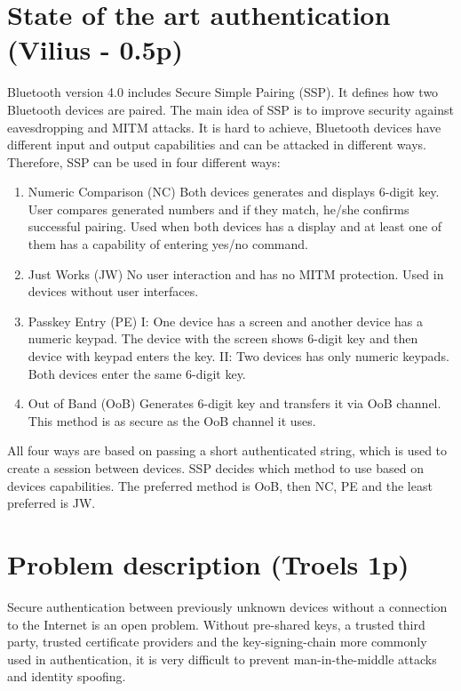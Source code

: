 \documentclass[12pt]{article}
\begin{document}
\section{State of the art authentication (Vilius - 0.5p)}
\label{sec:State of the art authentication}

Bluetooth version 4.0 includes Secure Simple Pairing (SSP). It defines how two Bluetooth devices are paired. The main idea of SSP is to improve security against eavesdropping and MITM attacks. It is hard to achieve, Bluetooth devices have different input and output capabilities and can be attacked in different ways. Therefore, SSP can be used in four different ways:
\begin{enumerate}
	\item Numeric Comparison (NC)
	Both devices generates and displays 6-digit key. User compares generated numbers and if they match, he/she confirms successful pairing. Used when both devices has a display and at least one of them has a capability of entering yes/no command.
	\item Just Works (JW)
	No user interaction and has no MITM protection. Used in devices without user interfaces.

	\item Passkey Entry (PE)
I: One device has a screen and another device has a numeric keypad. The device with the screen shows 6-digit key and then device with keypad enters the key.
	II: Two devices has only numeric keypads. Both devices enter the same 6-digit key.

	\item Out of Band (OoB)
Generates 6-digit key and transfers it via OoB channel. This method is as secure as the OoB channel it uses.
\end{enumerate}
All four ways are based on passing a short authenticated string, which is used to create a session between devices. SSP decides which method to use based on devices capabilities. The preferred method is  OoB, then NC, PE and the least preferred is JW.

\newpage

\section{Problem description (Troels 1p)}
\label{sec:Problem}

Secure authentication between previously unknown devices without a connection to the Internet is an open problem. Without pre-shared keys, a trusted third party, trusted certificate providers and the key-signing-chain more commonly used in authentication, it is very difficult to prevent man-in-the-middle attacks and identity spoofing.
\end{document}
